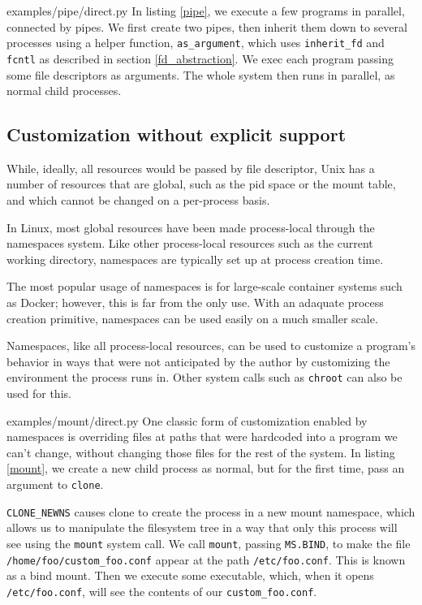 \documentclass[sigplan]{acmart}
\begin{document}

{examples/pipe/direct.py}
In listing \ref{pipe},
we execute a few programs in parallel,
connected by pipes.
We first create two pipes,
then inherit them down to several processes using a helper function, \verb|as_argument|,
which uses \verb|inherit_fd| and \texttt{fcntl} as described in section \ref{fd_abstraction}.
We exec each program passing some file descriptors as arguments.
The whole system then runs in parallel,
as normal child processes.
\subsection{Customization without explicit support}
While, ideally, all resources would be passed by file descriptor,\cite{capsicum}
Unix has a number of resources that are global,
such as the pid space or the mount table,
and which cannot be changed on a per-process basis.

In Linux, most global resources have been made process-local
through the namespaces system.
Like other process-local resources such as the current working directory,
namespaces are typically set up at process creation time.

The most popular usage of namespaces is for large-scale container systems such as Docker;
however, this is far from the only use.
With an adaquate process creation primitive,
namespaces can be used easily on a much smaller scale.

Namespaces, like all process-local resources,
can be used to customize a program's behavior
in ways that were not anticipated by the author
by customizing the environment the process runs in.
Other system calls such as \texttt{chroot} can also be used for this.


{examples/mount/direct.py}
One classic form of customization enabled by namespaces
is overriding files at paths that were hardcoded into a program we can't change,
without changing those files for the rest of the system.
In listing \ref{mount},
we create a new child process as normal,
but for the first time,
pass an argument to \texttt{clone}.

\verb|CLONE_NEWNS| causes clone to create the process in a new mount namespace,
which allows us to manipulate the filesystem tree in a way that only this process will see
using the \texttt{mount} system call.
We call \texttt{mount}, passing \texttt{MS.BIND}, to make the file \verb|/home/foo/custom_foo.conf|
appear at the path \verb|/etc/foo.conf|.
This is known as a bind mount.
Then we execute some executable,
which, when it opens \verb|/etc/foo.conf|, will see the contents of our \verb|custom_foo.conf|.
\end{document}
